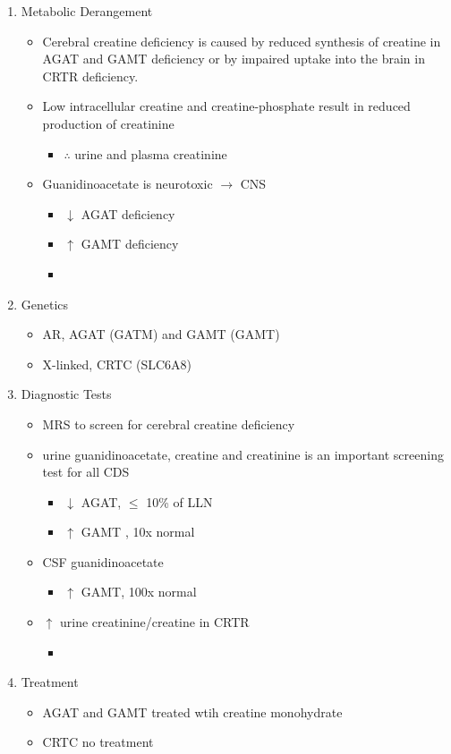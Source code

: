 \documentclass{scrartcl}
\begin{document}
\begin{enumerate}
\item Metabolic Derangement
\label{sec:org608f48e}
\begin{itemize}
\item Cerebral  creatine  deficiency is  caused  by  reduced synthesis  of
creatine in AGAT and GAMT deficiency  or by impaired uptake into the
brain in CRTR deficiency.
\item Low intracellular creatine and creatine-phosphate result in reduced
production of creatinine
\begin{itemize}
\item \(\therefore\) \low urine and plasma creatinine
\end{itemize}
\item Guanidinoacetate is neurotoxic \(\to\) CNS
\begin{itemize}
\item \(\downarrow\) AGAT deficiency
\item \(\uparrow\) GAMT deficiency
\item 
\end{itemize}
\end{itemize}
\item Genetics
\label{sec:orgce08289}
\begin{itemize}
\item AR, AGAT (GATM) and GAMT (GAMT)
\item X-linked, CRTC (SLC6A8)
\end{itemize}
\item Diagnostic Tests
\label{sec:org506b6cf}
\begin{itemize}
\item MRS to screen for cerebral creatine deficiency
\item urine guanidinoacetate, creatine and creatinine is an important
screening test for all CDS
\begin{itemize}
\item \(\downarrow\) AGAT, \(\le\) 10\% of LLN
\item \(\uparrow\) GAMT , 10x normal
\end{itemize}
\item CSF guanidinoacetate
\begin{itemize}
\item \(\uparrow\) GAMT, 100x normal
\end{itemize}
\item \(\uparrow\) urine creatinine/creatine in CRTR 
\begin{itemize}
\item 
\end{itemize}
\end{itemize}
\item Treatment
\label{sec:orge99c8e2}
\begin{itemize}
\item AGAT and GAMT treated wtih creatine monohydrate
\item CRTC no treatment
\end{itemize}
\end{enumerate}
\end{document}
